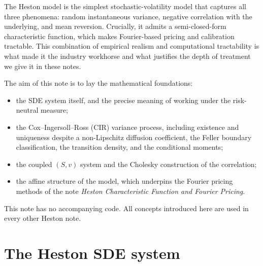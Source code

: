 \documentclass[11pt]{article}
\theoremstyle{plain}
\theoremstyle{definition}
\theoremstyle{remark}
\begin{document}
The Heston model \cite{Heston1993} is the simplest stochastic-volatility model that captures all three phenomena: random instantaneous variance, negative correlation with the underlying, and mean reversion. Crucially, it admits a semi-closed-form characteristic function, which makes Fourier-based pricing and calibration tractable. This combination of empirical realism and computational tractability is what made it the industry workhorse and what justifies the depth of treatment we give it in these notes.

The aim of this note is to lay the mathematical foundations:
\begin{itemize}[topsep=2pt]
    \item the SDE system itself, and the precise meaning of working under the risk-neutral measure;
    \item the Cox--Ingersoll--Ross (CIR) variance process, including existence and uniqueness despite a non-Lipschitz diffusion coefficient, the Feller boundary classification, the transition density, and the conditional moments;
    \item the coupled \((S, v)\) system and the Cholesky construction of the correlation;
    \item the affine structure of the model, which underpins the Fourier pricing methods of the note \emph{Heston Characteristic Function and Fourier Pricing}.
\end{itemize}
This note has no accompanying code. All concepts introduced here are used in every other Heston note.

\section{The Heston SDE system}
\end{document}
